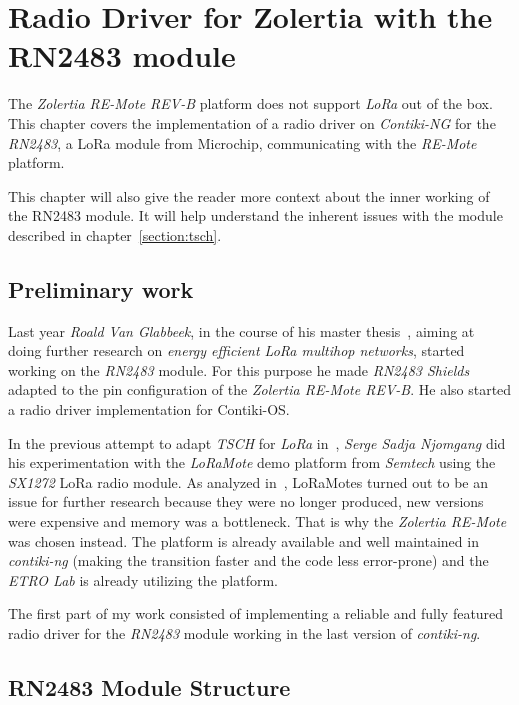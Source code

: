 \chapter{Radio Driver for Zolertia with the RN2483 module\label{section:radio}}


The \emph{Zolertia RE-Mote REV-B} platform does not support \emph{LoRa} out of
the box. This chapter covers the implementation of a radio driver on
\emph{Contiki-NG} for the \emph{RN2483}, a LoRa module from Microchip,
communicating with the \emph{RE-Mote} platform.

This chapter will also give the reader more context about the inner working of
the RN2483 module.
It will help understand the inherent issues with the module
described in chapter~\ref{section:tsch}.

\section{Preliminary work}

Last year \emph{Roald Van Glabbeek}, in the course of his master thesis~\cite{8847137}, 
aiming at doing further research on \emph{energy efficient LoRa multihop networks}, 
started working on the \emph{RN2483} module.
For this purpose he made \emph{RN2483 Shields} adapted to the pin
configuration of the \emph{Zolertia RE-Mote REV-B}. He also started a radio driver
implementation for Contiki-OS\@.

In the previous attempt to adapt \emph{TSCH} for \emph{LoRa}
in~\cite{njomgang_2018}, \emph{Serge Sadja Njomgang} did his experimentation with 
the \emph{LoRaMote} demo platform from \emph{Semtech} using the \emph{SX1272} LoRa 
radio module.
As analyzed in~\cite{8847137}, LoRaMotes turned out to be an issue for
further research because they were no longer produced, 
new versions were expensive and memory was a bottleneck.
That is why the \emph{Zolertia RE-Mote} was chosen instead. 
The platform is already available and well maintained in \emph{contiki-ng}
(making the transition faster and the code less error-prone) and the \emph{ETRO
Lab} is already utilizing the platform.

The first part of my work consisted of implementing a reliable
and fully featured radio driver for the \emph{RN2483} module working in the last
version of \emph{contiki-ng}.

\section{RN2483 Module Structure}

